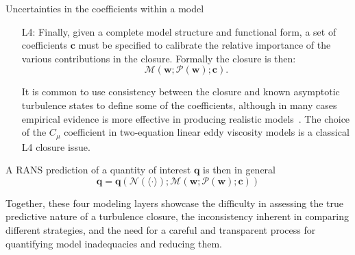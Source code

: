 \documentclass[a4paper]{ar-1col}
\begin{document}
\begin{itemize}
\begin{itemize}
\begin{itemize}
\begin{marginnote}[]
 {Uncertainties in the coefficients within a model}
\end{marginnote}


\begin{itemize}
\item[L4:]
 Finally, given a complete model structure and functional form, a set of coefficients $\mathbf{c}$ must be specified to calibrate the relative importance of the various
 contributions in the closure. Formally the closure is then:
 \begin{equation}
 \mathcal M (   \mathbf{w}; \mathcal P(  \mathbf{w}  );  \mathbf{c} ).     
  \label{eq:L4}
 \end{equation}

 It is common to use consistency between the closure and known asymptotic turbulence states to define some of the coefficients,
 although in many cases empirical evidence is  more effective in producing realistic models~\citep{durbin2017some}. The choice of the $C_\mu$ coefficient in two-equation linear eddy viscosity models is a classical L4 closure issue.
 \end{itemize}
 \end{itemize}
 \end{itemize}
 \end{itemize}
 
A RANS prediction of a quantity of interest  $ \mathbf{q}$ is then in general
\begin{equation}
 \mathbf{q} = \mathbf{q} \left(   \mathcal N( \langle \cdot \rangle ); \mathcal M (   \mathbf{w}; \mathcal P(  \mathbf{w}  );  \mathbf{c} ) \right)
  \end{equation}

Together, these four modeling layers showcase the difficulty in assessing the true predictive nature of a turbulence closure, the inconsistency inherent in comparing different strategies, and the need for a
careful and transparent process for quantifying model inadequacies and reducing them.
\end{document}
